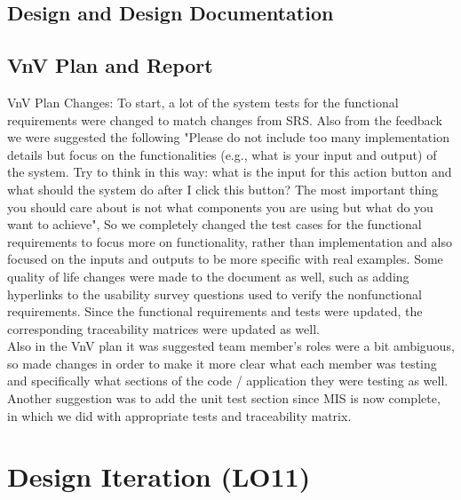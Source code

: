 \documentclass{article}
\begin{document}
\subsection{Design and Design Documentation}

\subsection{VnV Plan and Report}

VnV Plan Changes: To start, a lot of the system tests for the functional requirements were changed to match changes from SRS. Also from the feedback we were suggested the following "Please do not include too many implementation details but focus on the functionalities (e.g., what is your input and output) of the system. Try to think in this way: what is the input for this action button and what should the system do after I click this button? The most important thing you should care about is not what components you are using but what do you want to achieve", So we completely changed the test cases for the functional requirements to focus more on functionality, rather than implementation and also focused on the inputs and outputs to be more specific with real examples. Some quality of life changes were made to the document as well, such as adding hyperlinks to the usability survey questions used to verify the nonfunctional requirements. Since the functional requirements and tests were updated, the corresponding traceability matrices were updated as well. \\

Also in the VnV plan it was suggested team member's roles were a bit ambiguous, so made changes in order to make it more clear what each member was testing and specifically what sections of the code / application they were testing as well. Another suggestion was to add the unit test section since MIS is now complete, in which we did with appropriate tests and traceability matrix.

\section{Design Iteration (LO11)}
\end{document}
